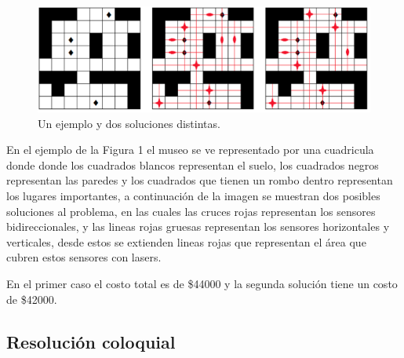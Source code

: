 \begin{figure}[H]
	\begin{center}
		\includegraphics[width=320pt]{../imgs/ej3_ejemploCatedra.png}
	\end{center}
\caption{Un ejemplo y dos soluciones distintas.}
\end{figure}

En el ejemplo de la Figura 1 el museo se ve representado por una cuadricula donde donde los cuadrados blancos representan el suelo, los cuadrados negros representan las paredes y los cuadrados que tienen un rombo dentro representan los lugares importantes, a continuación de la imagen se muestran dos posibles soluciones al problema, en las cuales las cruces rojas representan los sensores bidireccionales, y las lineas rojas gruesas representan los sensores horizontales y verticales, desde estos se extienden lineas rojas que representan el área que cubren estos sensores con lasers.

En el primer caso el costo total es de \$44000 y la segunda solución tiene un costo de \$42000.

\subsection{Resolución coloquial}

